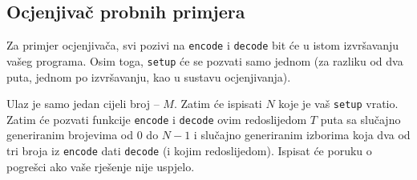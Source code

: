 \documentclass[12pt]{article}
\begin{document}
\subsection{Ocjenjivač probnih primjera}

Za primjer ocjenjivača, svi pozivi na \texttt{encode} i \texttt{decode} bit će u istom izvršavanju vašeg programa. Osim toga, \texttt{setup} će se pozvati samo jednom (za razliku od dva puta, jednom po izvršavanju, kao u sustavu ocjenjivanja).

Ulaz je samo jedan cijeli broj -- $M$. Zatim će ispisati $N$ koje je vaš \texttt{setup} vratio. Zatim će pozvati funkcije \texttt{encode} i \texttt{decode} ovim redoslijedom $T$ puta sa slučajno generiranim brojevima od $0$ do $N-1$ i slučajno generiranim izborima koja dva od tri broja iz \texttt{encode} dati \texttt{decode} (i kojim redoslijedom). Ispisat će poruku o pogrešci ako vaše rješenje nije uspjelo.
\end{document}
